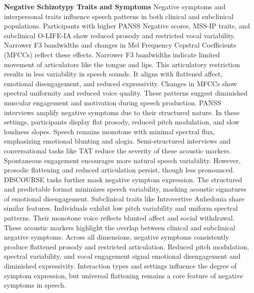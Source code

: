 \documentclass[9pt,a4paper]{rho-class/rho}
\begin{document}
\textbf{Negative Schizotypy Traits and Symptoms} Negative symptoms and interpersonal traits influence speech patterns in both clinical and subclinical populations. Participants with higher PANSS Negative scores, MSS-IP traits, and subclinical O-LIFE-IA show reduced prosody and restricted vocal variability. Narrower F3 bandwidths and changes in Mel Frequency Cepstral Coefficients (MFCCs) reflect these effects.
Narrower F3 bandwidths indicate limited movement of articulators like the tongue and lips. This articulatory restriction results in less variability in speech sounds. It aligns with flattened affect, emotional disengagement, and reduced expressivity. Changes in MFCCs show spectral uniformity and reduced voice quality. These patterns suggest diminished muscular engagement and motivation during speech production.
PANSS interviews amplify negative symptoms due to their structured nature. In these settings, participants display flat prosody, reduced pitch modulation, and slow loudness slopes. Speech remains monotone with minimal spectral flux, emphasizing emotional blunting and alogia.
Semi-structured interviews and conversational tasks like TAT reduce the severity of these acoustic markers. Spontaneous engagement encourages more natural speech variability. However, prosodic flattening and reduced articulation persist, though less pronounced. DISCOURSE tasks further mask negative symptom expression. The structured and predictable format minimizes speech variability, masking acoustic signatures of emotional disengagement.
Subclinical traits like Introvertive Anhedonia share similar features. Individuals exhibit low pitch variability and uniform spectral patterns. Their monotone voice reflects blunted affect and social withdrawal. These acoustic markers highlight the overlap between clinical and subclinical negative symptoms.
Across all dimensions, negative symptoms consistently produce flattened prosody and restricted articulation. Reduced pitch modulation, spectral variability, and vocal engagement signal emotional disengagement and diminished expressivity. Interaction types and settings influence the degree of symptom expression, but universal flattening remains a core feature of negative symptoms in speech.
\end{document}
